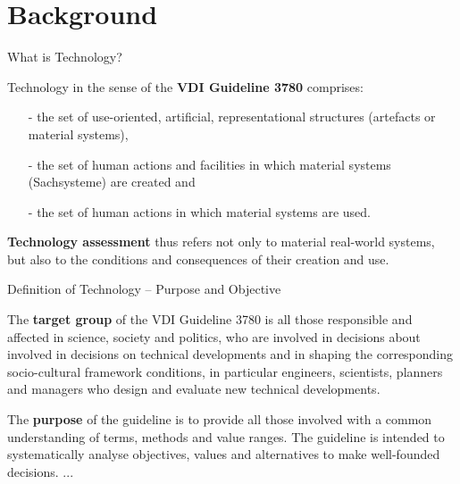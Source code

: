 \documentclass{beamer}
\title{Modelling Sustainable Systems\\ and Semantic Web\\[6pt] Technology
  \vskip1em}
\subtitle{Lecture in the Module 10-202-2309\\ for Master Computer Science}
\author{Prof. Dr. Hans-Gert Gräbe\\
\url{http://www.informatik.uni-leipzig.de/~graebe}}
\date{April 2021}
\begin{document}
{
\begin{frame}
  \titlepage
\end{frame}}

\section{Background}
\begin{frame}{What is Technology?}

Technology in the sense of the \textbf{VDI Guideline 3780} comprises:
\begin{itemize}
\item[-] the set of use-oriented, artificial, representational structures
  (artefacts or material systems),
\item[-] the set of human actions and facilities in which material systems
  (Sachsysteme) are created and
\item[-] the set of human actions in which material systems are used.
\end{itemize}
\textbf{Technology assessment} thus refers not only to material real-world
systems, but also to the conditions and consequences of their creation and
use.
\end{frame}

\begin{frame}{Definition of Technology -- Purpose and Objective}

The \textbf{target group} of the VDI Guideline 3780 is all those responsible
and affected in science, society and politics, who are involved in decisions
about involved in decisions on technical developments and in shaping the
corresponding socio-cultural framework conditions, in particular engineers,
scientists, planners and managers who design and evaluate new technical
developments.

The \textbf{purpose} of the guideline is to provide all those involved with a
common understanding of terms, methods and value ranges. The guideline is
intended to systematically analyse objectives, values and alternatives to make
well-founded decisions. ...

\end{frame}
\end{document}
